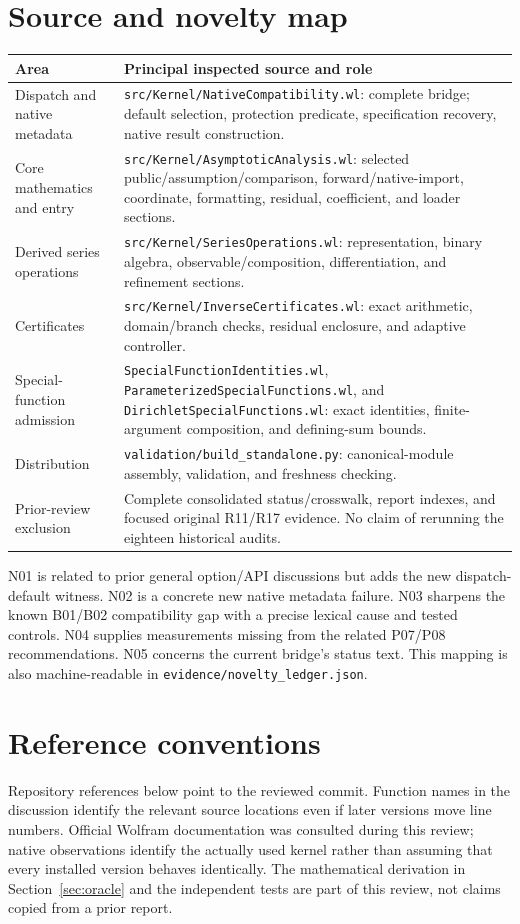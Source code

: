 \documentclass[11pt]{article}
\newcommand{\code}[1]{\texttt{#1}}
\begin{document}
\section{Source and novelty map}
\begin{longtable}{@{}P{3.4cm}P{11.4cm}@{}}
\toprule
Area & Principal inspected source and role\\ \midrule
\endhead
Dispatch and native metadata & \code{src/Kernel/NativeCompatibility.wl}: complete bridge; default selection, protection predicate, specification recovery, native result construction.\\[0.4em]
Core mathematics and entry & \code{src/Kernel/AsymptoticAnalysis.wl}: selected public/assumption/comparison, forward/native-import, coordinate, formatting, residual, coefficient, and loader sections.\\[0.4em]
Derived series operations & \code{src/Kernel/SeriesOperations.wl}: representation, binary algebra, observable/composition, differentiation, and refinement sections.\\[0.4em]
Certificates & \code{src/Kernel/InverseCertificates.wl}: exact arithmetic, domain/branch checks, residual enclosure, and adaptive controller.\\[0.4em]
Special-function admission & \nolinkurl{SpecialFunctionIdentities.wl}, \nolinkurl{ParameterizedSpecialFunctions.wl}, and \nolinkurl{DirichletSpecialFunctions.wl}: exact identities, finite-argument composition, and defining-sum bounds.\\[0.4em]
Distribution & \code{validation/build\_standalone.py}: canonical-module assembly, validation, and freshness checking.\\[0.4em]
Prior-review exclusion & Complete consolidated status/crosswalk, report indexes, and focused original R11/R17 evidence. No claim of rerunning the eighteen historical audits.\\
\bottomrule
\end{longtable}

N01 is related to prior general option/API discussions but adds the new dispatch-default witness. N02 is a concrete new native metadata failure. N03 sharpens the known B01/B02 compatibility gap with a precise lexical cause and tested controls. N04 supplies measurements missing from the related P07/P08 recommendations. N05 concerns the current bridge's status text. This mapping is also machine-readable in \code{evidence/novelty\_ledger.json}.

\section{Reference conventions}
Repository references below point to the reviewed commit. Function names in the discussion identify the relevant source locations even if later versions move line numbers. Official Wolfram documentation was consulted during this review; native observations identify the actually used kernel rather than assuming that every installed version behaves identically. The mathematical derivation in Section~\ref{sec:oracle} and the independent tests are part of this review, not claims copied from a prior report.
\end{document}
